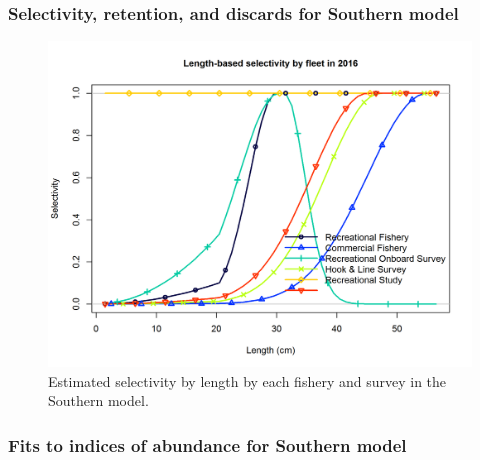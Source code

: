\documentclass[12pt,]{article}
\begin{document}
\FloatBarrier

\newpage 

\subsubsection{Selectivity, retention, and discards for Southern
model}\label{selectivity-retention-and-discards-for-southern-model}

\begin{figure}[htbp]
\centering
\includegraphics{r4ss/plots_mod2/sel01_multiple_fleets_length1.png}
\caption{Estimated selectivity by length by each fishery and survey in
the Southern model. \label{fig:selex.S}}
\end{figure}

\FloatBarrier 

\newpage

\subsubsection{Fits to indices of abundance for Southern
model}\label{fits-to-indices-of-abundance-for-southern-model}
\end{document}
